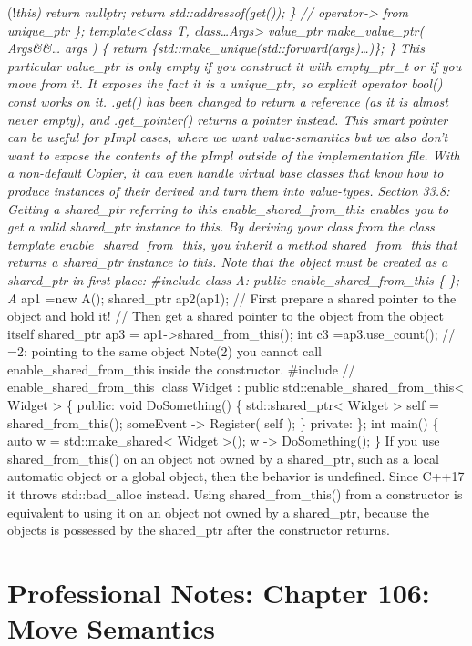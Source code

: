 (!\emph{this) return nullptr; return std::addressof(get()); \} //
operator-\textgreater{} from unique\_ptr \}; template\textless class T,
class\ldots Args\textgreater{} value\_ptr make\_value\_ptr(
Args\&\&\ldots{} args ) \{ return
\{std::make\_unique(std::forward(args)\ldots)\}; \} This particular
value\_ptr is only empty if you construct it with empty\_ptr\_t or if
you move from it. It exposes the fact it is a unique\_ptr, so explicit
operator bool() const works on it. .get() has been changed to return a
reference (as it is almost never empty), and .get\_pointer() returns a
pointer instead. This smart pointer can be useful for pImpl cases, where
we want value-semantics but we also don't want to expose the contents of
the pImpl outside of the implementation ﬁle. With a non-default Copier,
it can even handle virtual base classes that know how to produce
instances of their derived and turn them into value-types. Section 33.8:
Getting a shared\_ptr referring to this enable\_shared\_from\_this
enables you to get a valid shared\_ptr instance to this. By deriving
your class from the class template enable\_shared\_from\_this, you
inherit a method shared\_from\_this that returns a shared\_ptr instance
to this. Note that the object must be created as a shared\_ptr in ﬁrst
place: \#include class A: public enable\_shared\_from\_this \{ \}; A}
ap1 =new A(); shared\_ptr ap2(ap1); // First prepare a shared pointer to
the object and hold it! // Then get a shared pointer to the object from
the object itself shared\_ptr ap3 =
ap1-\textgreater shared\_from\_this(); int c3 =ap3.use\_count(); // =2:
pointing to the same object Note(2) you cannot call
enable\_shared\_from\_this inside the constructor. \#include //
enable\_shared\_from\_this class Widget : public
std::enable\_shared\_from\_this\textless{} Widget \textgreater{} \{
public: void DoSomething() \{ std::shared\_ptr\textless{} Widget
\textgreater{} self = shared\_from\_this(); someEvent -\textgreater{}
Register( self ); \} private: \}; int main() \{ auto w =
std::make\_shared\textless{} Widget \textgreater(); w -\textgreater{}
DoSomething(); \} If you use shared\_from\_this() on an object not owned
by a shared\_ptr, such as a local automatic object or a global object,
then the behavior is undeﬁned. Since C++17 it throws std::bad\_alloc
instead. Using shared\_from\_this() from a constructor is equivalent to
using it on an object not owned by a shared\_ptr, because the objects is
possessed by the shared\_ptr after the constructor returns.

\hypertarget{professional-notes-chapter-106-move-semantics-1}{%
\chapter{Professional Notes: Chapter 106: Move
Semantics}\label{professional-notes-chapter-106-move-semantics-1}}

